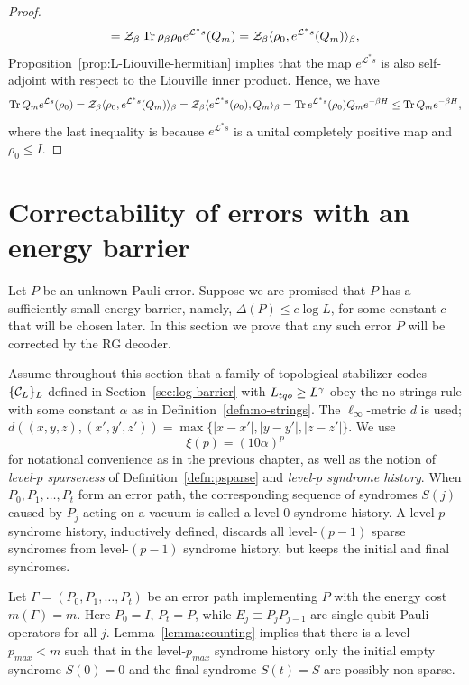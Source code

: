 \begin{proof}
\begin{equation}
= \mathcal Z_\beta \mathop{\mathrm{Tr}}\nolimits{ \rho_\beta \rho_0 e^{\mathcal L^* s} (Q_m)}
= \mathcal Z_\beta \langle \rho_0, e^{\mathcal L^* s} (Q_m) \rangle_\beta,
\end{equation}
Proposition~\ref{prop:L-Liouville-hermitian} implies 
that the map $e^{\mathcal L^* s}$ is also self-adjoint with respect to the Liouville inner product.
Hence, we have
\begin{equation}
\mathop{\mathrm{Tr}}\nolimits{ Q_m  e^{\mathcal L s} (\rho_0)}
=   \mathcal Z_\beta \langle \rho_0, e^{\mathcal L^* s} (Q_m) \rangle_\beta
=   \mathcal Z_\beta \langle e^{\mathcal L^* s} (\rho_0), Q_m \rangle_\beta
=   \mathop{\mathrm{Tr}}\nolimits{e^{\mathcal L^* s}(\rho_0) Q_m e^{-\beta H}}
\le \mathop{\mathrm{Tr}}\nolimits{Q_m e^{-\beta H}},
\label{trace_final}
\end{equation}
where the last inequality is because
$e^{\mathcal L^* s}$ is a unital completely positive map
and $\rho_0 \le I$.
\end{proof}


\section{Correctability of errors with an energy barrier}
\label{sec:Correctability}

Let $P$ be an unknown Pauli error.
Suppose we are promised that $P$ has a sufficiently small
energy barrier, namely, $\Delta(P) \le c \log{L}$, for some constant $c$ that will be chosen later.
In this section we prove that any such error $P$ will be corrected by the RG decoder.

Assume throughout this section that a family of topological stabilizer codes $\{ {\cal C}_L\}_L$
defined in Section~\ref{sec:log-barrier} with ${L_{tqo}} \ge L^\gamma$
obey the no-strings rule with some constant $\alpha$ as in Definition~\ref{defn:no-strings}.
The $\ell_\infty$-metric $d$ is used; $d((x,y,z),(x',y',z'))= \max \{ |x-x'|,|y-y'|,|z-z'| \}$.
We use 
\[ 
\xi(p)= (10\alpha)^p 
\]
for notational convenience as in the previous chapter,
as well as the notion of \emph{level-$p$ sparseness} of Definition~\ref{defn:psparse}
and \emph{level-$p$ syndrome history}.
When $P_0,P_1,\ldots,P_t$ form an error path,
the corresponding sequence of syndromes $S(j)$ caused by $P_j$ acting on a vacuum
 is called a level-$0$ syndrome history.
A level-$p$ syndrome history, inductively defined, 
discards all level-$(p-1)$ sparse syndromes from level-$(p-1)$ syndrome history,
but keeps the initial and final syndromes.


Let $\Gamma=(P_0,P_1,\ldots,P_t)$ be an error path implementing $P$
with the energy cost $m(\Gamma)=m$.
Here $P_0=I$, $P_t=P$, while $E_j\equiv P_j P_{j-1}$ are single-qubit Pauli operators
for all $j$.
Lemma~\ref{lemma:counting} implies that
there is a level $p_{max} < m$ such that
in the level-$p_{max}$ syndrome history
only the initial empty syndrome $S(0)=0$ and the final syndrome $S(t)=S$
are possibly non-sparse.

